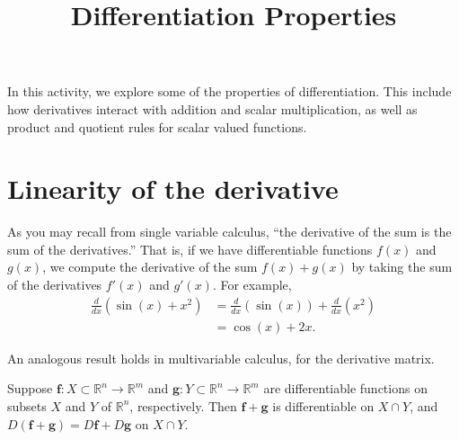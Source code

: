 \documentclass{ximera}
\title{Differentiation Properties}
\begin{document}
\begin{abstract}
\end{abstract}
\maketitle

In this activity, we explore some of the properties of differentiation. This include how derivatives interact with addition and scalar multiplication, as well as product and quotient rules for scalar valued functions.

\section{Linearity of the derivative}

As you may recall from single variable calculus, ``the derivative of the sum is the sum of the derivatives.'' That is, if we have differentiable functions $f(x)$ and $g(x)$, we compute the derivative of the sum $f(x)+g(x)$ by taking the sum of the derivatives $f'(x)$ and $g'(x)$. For example,
\begin{align*}
\frac{d}{dx}\left(\sin(x)+x^2\right) &= \frac{d}{dx}\left(\sin(x)\right) + \frac{d}{dx}\left(x^2\right)\\
&= \cos(x)+2x.
\end{align*}

An analogous result holds in multivariable calculus, for the derivative matrix.

\begin{proposition}
Suppose $\mathbf{f}:X\subset \mathbb{R}^n\rightarrow \mathbb{R}^m$ and $\mathbf{g}:Y\subset\mathbb{R}^n\rightarrow\mathbb{R}^m$ are differentiable functions on subsets $X$ and $Y$ of $\mathbb{R}^n$, respectively. Then $\mathbf{f}+\mathbf{g}$ is differentiable on $X\cap Y$, and $D(\mathbf{f}+\mathbf{g})=D\mathbf{f}+D\mathbf{g}$ on $X\cap Y$.
\end{proposition}
\end{document}
